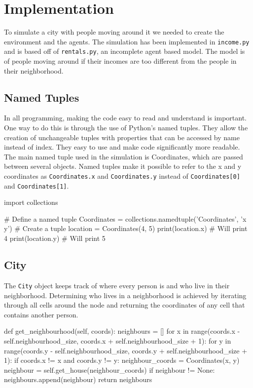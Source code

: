 \section{Implementation}

\par
To simulate a city with people moving around it we needed to create the environment and the agents. The simulation has been implemented in \texttt{income.py} and is based off of \texttt{rentals.py}, an incomplete agent based model. The model is of people moving around if their incomes are too different from the people in their neighborhood.

\subsection{Named Tuples}

In all programming, making the code easy to read and understand is important. One way to do this is through the use of Python's named tuples. They allow the creation of unchangeable tuples with properties that can be accessed by name instead of index. They easy to use and make code significantly more readable. The main named tuple used in the simulation is Coordinates, which are passed between several objects. Named tuples make it possible to refer to the x and y coordinates as \texttt{Coordinates.x} and \texttt{Coordinates.y} instead of \texttt{Coordinates[0]} and \texttt{Coordinates[1]}.

\begin{code}[language=Python]
import collections

# Define a named tuple
Coordinates = collections.namedtuple('Coordinates', 'x y')
# Create a tuple
location = Coordinates(4, 5)
print(location.x) # Will print 4
print(location.y) # Will print 5
\end{code}

\subsection{City}

\par
The \texttt{City} object keeps track of where every person is and who live in their neighborhood. Determining who lives in a neighborhood is achieved by iterating through all cells around the node and returning the coordinates of any cell that contains another person.

\begin{code}[language=Python]
def get_neighbourhood(self, coords):
	neighbours = []
	for x in range(coords.x - self.neighbourhood_size, coords.x + self.neighbourhood_size + 1):
	    for y in range(coords.y - self.neighbourhood_size, coords.y + self.neighbourhood_size + 1):
	        if coords.x != x and coords.y != y:
	            neighbour_coords = Coordinates(x, y)
	            neighbour = self.get_house(neighbour_coords)
	            if neighbour != None:
	                neighbours.append(neighbour)
	return neighbours
\end{code}

